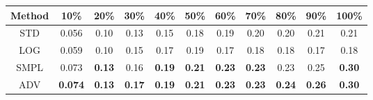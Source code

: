 \documentclass{standalone}
\begin{document}
\begin{tabular}{c|cccccccccc}
      \toprule
      Method & 10\% & 20\% & 30\% & 40\% & 50\% & 60\% & 70\% & 80\% & 90\% & 100\% \\
      \midrule
STD & 0.056 & 0.10 & 0.13 & 0.15 & 0.18 & 0.19 & 0.20 & 0.20 & 0.21 & 0.21\\
LOG & 0.059 & 0.10 & 0.15 & 0.17 & 0.19 & 0.17 & 0.18 & 0.18 & 0.17 & 0.18\\
SMPL & 0.073 & \textbf{0.13} & 0.16 & \textbf{0.19} & \textbf{0.21} & \textbf{0.23} & \textbf{0.23} & 0.23 & 0.25 & \textbf{0.30}\\
ADV & \textbf{0.074} & \textbf{0.13} & \textbf{0.17} & \textbf{0.19} & \textbf{0.21} & \textbf{0.23} & \textbf{0.23} & \textbf{0.24} & \textbf{0.26} & \textbf{0.30}\\
  \bottomrule
\end{tabular}
\end{document}
